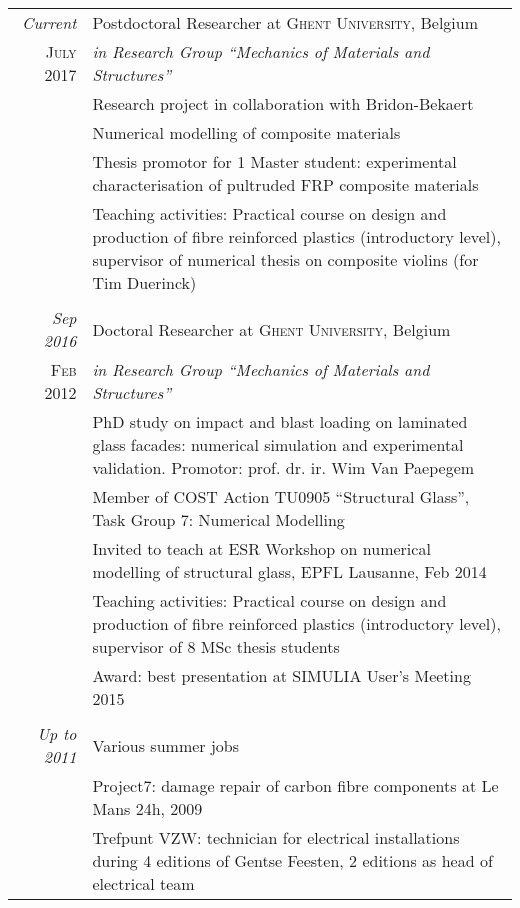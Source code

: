 \documentclass[a4paper,10pt]{article} %
\begin{document}
\begin{tabular}{r|p{12cm}}
\emph{Current} & Postdoctoral Researcher at \textsc{Ghent University}, Belgium \\
\textsc{July 2017} & \emph{in Research Group ``Mechanics of Materials and Structures''}\\ 
& \small{Research project in collaboration with Bridon-Bekaert}\\
& \small{Numerical modelling of composite materials}\\
& \small{Thesis promotor for 1 Master student: experimental characterisation of pultruded FRP composite materials}\\
& \small{Teaching activities: Practical course on design and production of fibre reinforced plastics (introductory level), supervisor of numerical thesis on composite violins (for Tim Duerinck)}\\
\\




\emph{Sep 2016} & Doctoral Researcher at \textsc{Ghent University}, Belgium \\
\textsc{Feb 2012} & \emph{in Research Group ``Mechanics of Materials and Structures''}\\ 
& \small{PhD study on impact and blast loading on laminated glass facades: numerical simulation and experimental validation. Promotor: prof. dr. ir. Wim Van Paepegem}\\
& \small{Member of COST Action TU0905 ``Structural Glass'', Task Group 7: Numerical Modelling}\\
& \small{Invited to teach at ESR Workshop on numerical modelling of structural glass, EPFL Lausanne, Feb 2014}\\
& \small{Teaching activities: Practical course on design and production of fibre reinforced plastics (introductory level), supervisor of 8 MSc thesis students}\\
& \small{Award: best presentation at SIMULIA User's Meeting 2015}\\
\\



\emph{Up to 2011} & Various summer jobs \\

& \small{Project7: damage repair of carbon fibre components at Le Mans 24h, 2009}\\
& \small{Trefpunt VZW: technician for electrical installations during 4 editions of Gentse Feesten, 2 editions as head of electrical team}\\



\end{tabular}
\end{document}

